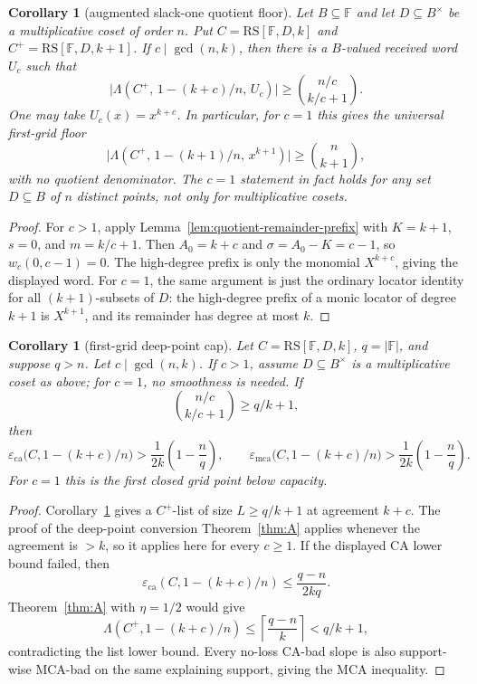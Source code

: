 \documentclass[11pt]{article}
\newtheorem{corollary}[theorem]{Corollary}
\theoremstyle{definition}
\theoremstyle{remark}
\newcommand{\F}{\mathbb{F}}
\newcommand{\B}{B}
\newcommand{\RS}{\mathrm{RS}}
\newcommand{\eca}{\varepsilon_{\mathrm{ca}}}
\newcommand{\emca}{\varepsilon_{\mathrm{mca}}}
\newcommand{\Lst}{\Lambda}
\begin{document}
\begin{corollary}[augmented slack-one quotient floor]
\label{cor:augmented-slack-one}
Let $\B\subseteq\F$ and let $D\subseteq\B^\times$ be a multiplicative coset
of order $n$.  Put $C=\RS[\F,D,k]$ and $C^+=\RS[\F,D,k+1]$.  If
$c\mid\gcd(n,k)$, then there is a $\B$-valued received word $U_c$ such that
\[
        \bigl|\Lst(C^+,\,1-(k+c)/n,\,U_c)\bigr|
        \ge
        \binom{n/c}{k/c+1} .
\]
One may take $U_c(x)=x^{k+c}$.  In particular, for $c=1$ this gives the
universal first-grid floor
\[
        \bigl|\Lst(C^+,\,1-(k+1)/n,\,x^{k+1})\bigr|
        \ge
        \binom n{k+1},
\]
with no quotient denominator.  The $c=1$ statement in fact holds for any set
$D\subseteq\B$ of $n$ distinct points, not only for multiplicative cosets.
\end{corollary}

\begin{proof}
For $c>1$, apply Lemma~\ref{lem:quotient-remainder-prefix} with $K=k+1$,
$s=0$, and $m=k/c+1$.  Then $A_0=k+c$ and $\sigma=A_0-K=c-1$, so
$w_c(0,c-1)=0$.  The high-degree prefix is only the monomial $X^{k+c}$, giving
the displayed word.  For $c=1$, the same argument is just the ordinary locator
identity for all $(k+1)$-subsets of $D$: the high-degree prefix of a monic
locator of degree $k+1$ is $X^{k+1}$, and its remainder has degree at most $k$.
\end{proof}

\begin{corollary}[first-grid deep-point cap]
\label{cor:first-grid-cap}
Let $C=\RS[\F,D,k]$, $q=|\F|$, and suppose $q>n$.  Let
$c\mid\gcd(n,k)$.  If $c>1$, assume $D\subseteq\B^\times$ is a
multiplicative coset as above; for $c=1$, no smoothness is needed.  If
\[
        \binom{n/c}{k/c+1}\ge q/k+1,
\]
then
\[
        \eca\bigl(C,1-(k+c)/n\bigr)
        >\frac1{2k}\left(1-\frac nq\right),
        \qquad
        \emca\bigl(C,1-(k+c)/n\bigr)
        >\frac1{2k}\left(1-\frac nq\right).
\]
For $c=1$ this is the first closed grid point below capacity.
\end{corollary}

\begin{proof}
Corollary~\ref{cor:augmented-slack-one} gives a $C^+$-list of size
$L\ge q/k+1$ at agreement $k+c$.  The proof of the deep-point conversion
Theorem~\ref{thm:A} applies whenever the agreement is $>k$, so it applies here
for every $c\ge1$.  If the displayed CA lower bound failed, then
\[
        \eca(C,1-(k+c)/n)\le \frac{q-n}{2kq}.
\]
Theorem~\ref{thm:A} with $\eta=1/2$ would give
\[
        \Lst(C^+,1-(k+c)/n)
        \le
        \left\lceil \frac{q-n}{k}\right\rceil
        < q/k+1,
\]
contradicting the list lower bound.  Every no-loss CA-bad slope is also
support-wise MCA-bad on the same explaining support, giving the MCA inequality.
\end{proof}
\end{document}
